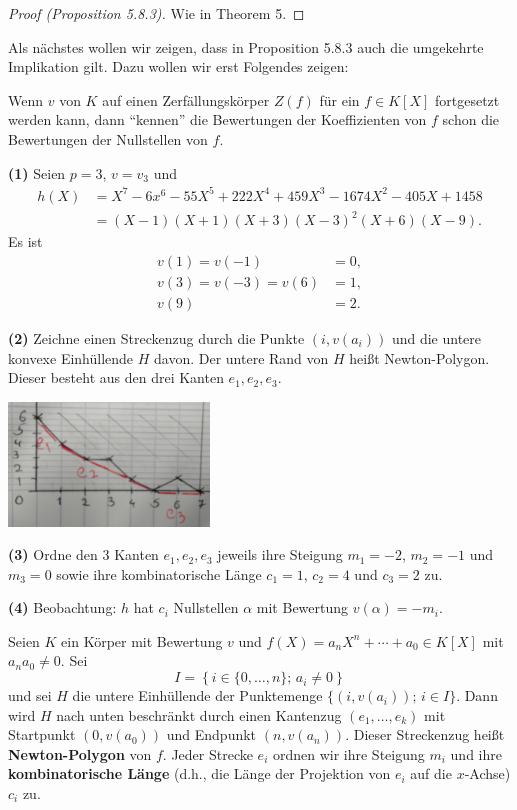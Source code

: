 \begin{proof}[Proof (Proposition 5.8.3)]
	Wie in Theorem 5.
\end{proof}

Als nächstes wollen wir zeigen, dass in Proposition 5.8.3 auch die umgekehrte Implikation gilt.
Dazu wollen wir erst Folgendes zeigen:

\bigskip Wenn $v$ von $K$ auf einen Zerfällungskörper $Z(f)$ für ein $f\in K[X]$ fortgesetzt werden kann, dann \enquote{kennen} die Bewertungen der Koeffizienten von $f$ schon die Bewertungen der Nullstellen von $f$.

\begin{Bsp}
	\textbf{(1)} Seien $p=3$, $v= v_3$ und
	\begin{align*}
	h(X)
	&= X^7-6x^6-55X^5+222X^4 +459X^3-1674X^2-405X+1458 \\
	&=(X-1)(X+1)(X+3)(X-3)^2(X+6)(X-9).
	\end{align*}
	Es ist
	\begin{align*}
	v(1)=v(-1)&=0, \\
	v(3)=v(-3)=v(6)&=1, \\
	v(9)&=2.
	\end{align*}
	
	\bigskip \textbf{(2)} Zeichne einen Streckenzug durch die Punkte $(i,v(a_i))$ 
	und die untere konvexe Einhüllende $H$ davon. Der untere Rand von $H$ heißt Newton-Polygon. Dieser besteht aus den drei Kanten $e_1, e_2, e_3$.
	\begin{center}
		\includegraphics[width=0.4\textwidth]{img/newton_polynomial.png}
	\end{center}
	
	\bigskip \textbf{(3)} Ordne den $3$ Kanten  $e_1, e_2, e_3$ jeweils ihre Steigung $m_1=-2$, $m_2 = -1$ und $m_3=0$ sowie ihre kombinatorische Länge $c_1 = 1$, $c_2 =4$ und $c_3 = 2$ zu.
	
	\bigskip \textbf{(4)} Beobachtung: $h$ hat $c_i$ Nullstellen $\alpha$ mit Bewertung $v(\alpha) = -m_i$.
\end{Bsp}

\begin{defi}
	Seien $K$ ein Körper mit Bewertung $v$ und $f(X)=a_nX^n+ \cdots + a_0 \in K[X]$ mit $a_n a_0 \neq 0$. Sei
	\[ I = \left\{
		i \in \{ 0, \dots, n \}; \, a_i \neq 0
	\right\}
	\]
	und sei $H$ die untere Einhüllende der Punktemenge $\{ (i,v(a_i)); \, i \in I  \}$. Dann wird $H$ nach unten beschränkt durch einen Kantenzug $(e_1, \dots, e_k)$ mit Startpunkt $(0,v(a_0))$ und Endpunkt $(n,v(a_n))$. Dieser Streckenzug heißt \textbf{Newton-Polygon} von $f$.
	Jeder Strecke $e_i$ ordnen wir ihre Steigung $m_i$ und ihre \textbf{kombinatorische Länge}
	(d.h., die Länge der Projektion von $e_i$ auf die $x$-Achse) $c_i$ zu.
\end{defi}


